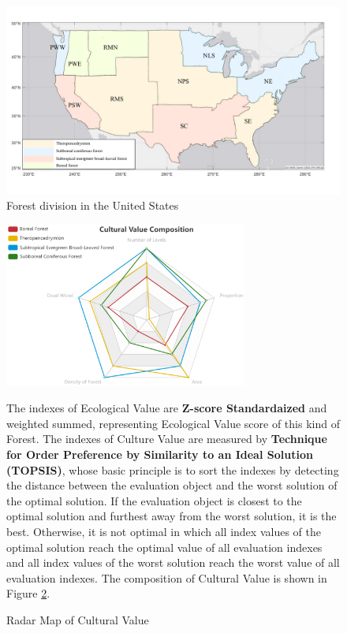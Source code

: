 \documentclass{mcmthesis}
\numberwithin{figure}{section}
\numberwithin{table}{section}
\numberwithin{equation}{section}
\begin{document}
\begin{figure}[htbp]
  \centering
  \includegraphics[width = 14cm]{code&pic/美国地图.pdf}
  \caption{Forest division in the United States}\label{USmap}
\end{figure}

\begin{figure}[ht]

  \hfill
  \begin{minipage}[htbp]{0.47\linewidth}
    \begin{flushleft}
      \includegraphics[width = 8cm]{code&pic/Cultural Value Composition.png}
      \caption{Radar Map of Cultural Value}\label{Radar}
    \end{flushleft}
  \end{minipage}
    \begin{minipage}[htbp]{0.45\linewidth}
      The indexes of Ecological Value are \textbf{Z-score Standardaized} and weighted summed, representing
      Ecological Value score of this kind of Forest. The indexes of Culture Value are 
      measured by \textbf{Technique for Order Preference by Similarity to an Ideal Solution (TOPSIS)}, 
      whose basic principle is to sort the indexes by detecting the distance between the 
      evaluation object and the worst solution of the optimal solution.  
      If the evaluation object is closest to the optimal solution and furthest 
      away from the worst solution, it is the best. Otherwise, it is not optimal 
      in which all index values of the optimal solution reach the optimal value 
      of all evaluation indexes and all index values of the worst solution reach 
      the worst value of all evaluation indexes. The composition of Cultural Value
      is shown in Figure \ref{Radar}.
  \end{minipage}
\end{figure}
\end{document}
